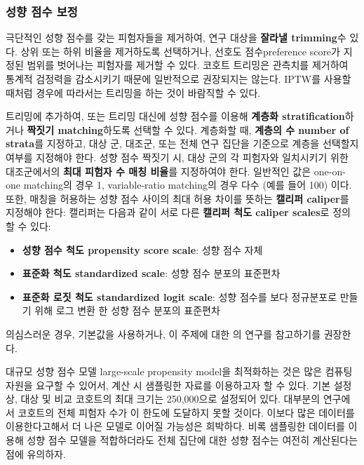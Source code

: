 \documentclass[11pt]{book}
\providecommand{\tightlist}{%
  \setlength{\itemsep}{0pt}\setlength{\parskip}{0pt}}
\theoremstyle{definition}
\theoremstyle{definition}
\theoremstyle{definition}
\theoremstyle{remark}
\begin{document}
\subsubsection*{성향 점수 보정}\label{--}

극단적인 성향 점수를 갖는 피험자들을 제거하여, 연구 대상을
\textbf{잘라낼 trimming}수 있다. 상위 또는 하위 비율을 제거하도록
선택하거나, 선호도 점수preference score가 지정된 범위를 벗어나는
피험자를 제거할 수 있다. 코호트 트리밍은 관측치를 제거하여 통계적
검정력을 감소시키기 때문에 일반적으로 권장되지는 않는다. IPTW를 사용할
때처럼 경우에 따라서는 트리밍을 하는 것이 바람직할 수 있다.

트리밍에 추가하여, 또는 트리밍 대신에 성향 점수를 이용해 \textbf{계층화
stratification}하거나 \textbf{짝짓기 matching}하도록 선택할 수 있다.
계층화할 때, \textbf{계층의 수 number of strata}를 지정하고, 대상 군,
대조군, 또는 전체 연구 집단을 기준으로 계층을 선택할지 여부를 지정해야
한다. 성향 점수 짝짓기 시, 대상 군의 각 피험자와 일치시키기 위한
대조군에서의 \textbf{최대 피험자 수 매칭 비율}를 지정하여야 한다.
일반적인 값은 one-on-one matching의 경우 1, variable-ratio matching의
경우 다수 (예를 들어 100) 이다. 또한, 매칭을 허용하는 성향 점수 사이의
최대 허용 차이를 뜻하는 \textbf{캘리퍼 caliper}를 지정해야 한다:
캘리퍼는 다음과 같이 서로 다른 \textbf{캘리퍼 척도 caliper scales}로
정의할 수 있다: 

\begin{itemize}
\tightlist
\item
  \textbf{성향 점수 척도 propensity score scale}: 성향 점수 자체
\item
  \textbf{표준화 척도 standardized scale}: 성향 점수 분포의 표준편차
\item
  \textbf{표준화 로짓 척도 standardized logit scale}: 성향 점수를 보다
  정규분포로 만들기 위해 로그 변환 한 성향 점수 분포의 표준편차
\end{itemize}

의심스러운 경우, 기본값을 사용하거나, 이 주제에 대한 \citet{austin_2011}
의 연구를 참고하기를 권장한다.

대규모 성향 점수 모델 large-scale propensity model을 최적화하는 것은
많은 컴퓨팅 자원을 요구할 수 있어서, 계산 시 샘플링한 자료를 이용하고자
할 수 있다. 기본 설정 상, 대상 및 비교 코호트의 최대 크기는 250,000으로
설정되어 있다. 대부분의 연구에서 코호트의 전체 피험자 수가 이 한도에
도달하지 못할 것이다. 이보다 많은 데이터를 이용한다고해서 더 나은 모델로
이어질 가능성은 희박하다. 비록 샘플링한 데이터를 이용해 성향 점수 모델을
적합하더라도 전체 집단에 대한 성향 점수는 여전히 계산된다는 점에
유의하자.
\end{document}
